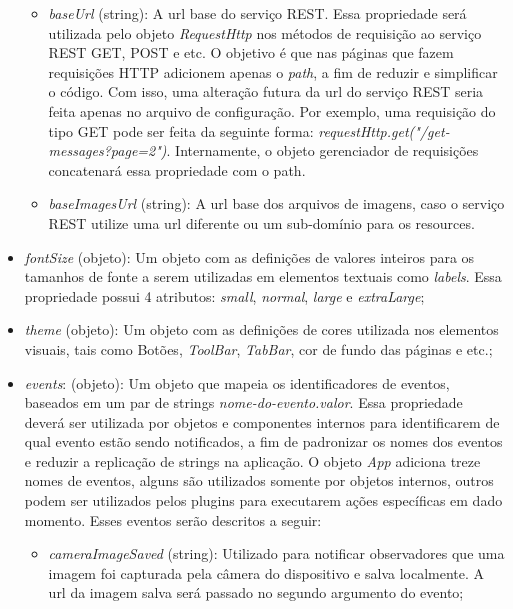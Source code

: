 \begin{itemize}
\begin{itemize}
		\item \textit{baseUrl} (string): A url base do serviço REST. Essa propriedade será utilizada pelo objeto \textit{RequestHttp} nos métodos de requisição ao serviço REST GET, POST e etc. O objetivo é que nas páginas que fazem requisições HTTP adicionem apenas o \textit{path}, a fim de reduzir e simplificar o código. Com isso, uma alteração futura da url do serviço REST seria feita apenas no arquivo de configuração. Por exemplo, uma requisição do tipo GET pode ser feita da seguinte forma: \textit{requestHttp.get("/get-messages?page=2")}. Internamente, o objeto gerenciador de requisições concatenará essa propriedade com o path.

		\item \textit{baseImagesUrl} (string): A url base dos arquivos de imagens, caso o serviço REST utilize uma url diferente ou um sub-domínio para os resources.
	\end{itemize}

	\item \textit{fontSize} (objeto): Um objeto com as definições de valores inteiros para os tamanhos de fonte a serem utilizadas em elementos textuais como \textit{labels}. Essa propriedade possui 4 atributos: \textit{small}, \textit{normal}, \textit{large} e \textit{extraLarge};

	\item \textit{theme} (objeto): Um objeto com as definições de cores utilizada nos elementos visuais, tais como Botões, \textit{ToolBar}, \textit{TabBar}, cor de fundo das páginas e etc.;

	\item \textit{events}: (objeto): Um objeto que mapeia os identificadores de eventos, baseados em um par de strings \textit{nome-do-evento.valor}. Essa propriedade deverá ser utilizada por objetos e componentes internos para identificarem de qual evento estão sendo notificados, a fim de padronizar os nomes dos eventos e reduzir a replicação de strings na aplicação. O objeto \textit{App} adiciona treze nomes de eventos, alguns são utilizados somente por objetos internos, outros podem ser utilizados pelos plugins para executarem ações específicas em dado momento. Esses eventos serão descritos a seguir:
	\begin{itemize}
		\item \textit{cameraImageSaved} (string): Utilizado para notificar observadores que uma imagem foi capturada pela câmera do dispositivo e salva localmente. A url da imagem salva será passado no segundo argumento do evento;


\end{itemize}
\end{itemize}
